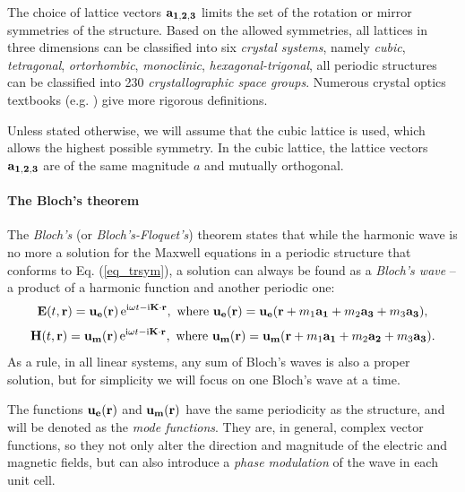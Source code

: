 The choice of lattice vectors ${\mathbf{a_{1,2,3}}}$ limits the set of the rotation or mirror symmetries of the structure. Based on the allowed symmetries, all lattices in three dimensions can be classified into six \textit{crystal systems}, namely \textit{cubic}, \textit{tetragonal}, \textit{ortorhombic}, \textit{monoclinic}, \textit{hexagonal-trigonal}, all periodic structures can be classified into 230 \textit{crystallographic space groups}. Numerous crystal optics textbooks (e.g. \cite[p. 678]{born1999book}) give more rigorous definitions. 

Unless stated otherwise, we will assume that the cubic lattice is used, which allows the highest possible symmetry. In the cubic lattice, the lattice vectors ${\mathbf{a_{1,2,3}}}$ are of the same magnitude $a$ and mutually orthogonal. %

\paragraph{The Bloch's theorem}%
The \textit{Bloch's} (or \textit{Bloch's-Floquet's}) theorem states that while the harmonic wave is no more a solution for the Maxwell equations in a periodic structure that conforms to Eq. (\ref{eq_trsym}), a solution can always be found as a \textit{Bloch's wave} -- a product of a harmonic function and another periodic one:
\begin{equation} 
\mathbf{E}(t, {\mathbf{r}}) = \mathbf{u_e}({\mathbf{r}})\,\mathrm{e}^{{\mathrm i}\omega t - {\mathrm i}{\mathbf{K}}\cdot{\mathbf{r}}}, \text{ where } \mathbf{u_e}({\mathbf{r}}) = \mathbf{u_e}({\mathbf{r}} + m_1 {\mathbf{a_1}} + m_2 {\mathbf{a_3}} + m_3 {\mathbf{a_3}}),
\label{eq_bloch}\end{equation} 
\begin{equation}
\mathbf{H}(t, {\mathbf{r}}) = \mathbf{u_m}({\mathbf{r}})\,\mathrm{e}^{{\mathrm i}\omega t - {\mathrm i}{\mathbf{K}}\cdot{\mathbf{r}}}, \text{ where } \mathbf{u_m}({\mathbf{r}}) = \mathbf{u_m}({\mathbf{r}} + m_1 {\mathbf{a_1}} + m_2 {\mathbf{a_2}} + m_3 {\mathbf{a_3}}).
\label{eq_blochh}\end{equation} 
As a rule, in all linear systems, any sum of Bloch's waves is also a proper solution, but for simplicity we will focus on one Bloch's wave at a time.

The functions $\mathbf{u_e}({\mathbf{r}})$ and $\mathbf{u_m}({\mathbf{r}})$ have the same periodicity as the structure, and will be denoted as the \textit{mode functions}. They are, in general, complex vector functions, so they not only alter the direction and magnitude of the electric and magnetic fields, but can also introduce a \textit{phase modulation} of the wave in each unit cell. 

